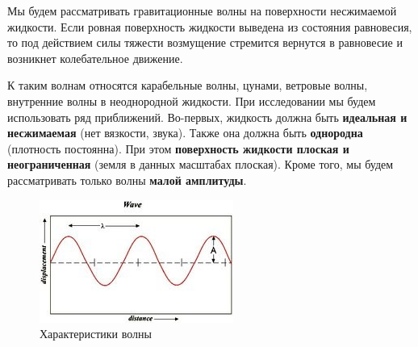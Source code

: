 Мы будем рассматривать гравитационные волны на поверхности
несжимаемой жидкости. Если ровная поверхность жидкости выведена
из состояния равновесия, то под действием силы тяжести возмущение
стремится вернутся в равновесие и возникнет колебательное движение.


К таким волнам относятся карабельные волны, цунами, ветровые волны, внутренние волны в неоднородной жидкости. При исследовании мы будем использовать ряд приближений. Во-первых, жидкость должна быть \textbf{идеальная и несжимаемая} (нет вязкости, звука). Также она должна быть \textbf{однородна} (плотность постоянна). При этом \textbf{поверхность жидкости плоская и неограниченная} (земля в данных масштабах плоская). Кроме того, мы будем рассматривать только волны \textbf{малой амплитуды}.

\begin{figure}[H]
    \centering
    \includegraphics[scale=1.25]{photo/simple_wave.jpg}
    \caption{Характеристики волны}
    \label{fig:simplewave}
\end{figure}

